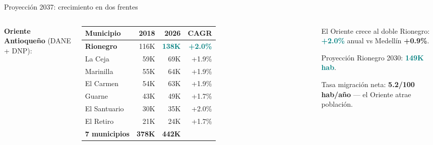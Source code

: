 \documentclass[aspectratio=169, 11pt]{beamer}
\newcommand{\highlight}[1]{\textcolor{teal}{\textbf{#1}}}
\newcommand{\src}[1]{\par\vspace{2pt}{\tiny\textcolor{slate}{Fuente: #1}}}
\begin{document}
\begin{frame}{Proyección 2037: crecimiento en dos frentes}
\begin{columns}[T]
{\small\textbf{Oriente Antioqueño} (DANE + DNP):}

\vspace{3pt}
{\scriptsize
\begin{tabular}{@{}lrrr@{}}
\toprule
\textbf{Municipio} & \textbf{2018} & \textbf{2026} & \textbf{CAGR} \\
\midrule
\rowcolor{teal!8}
\textbf{Rionegro} & 116K & \highlight{138K} & \highlight{+2.0\%} \\
La Ceja & 59K & 69K & +1.9\% \\
Marinilla & 55K & 64K & +1.9\% \\
El Carmen & 54K & 63K & +1.9\% \\
Guarne & 43K & 49K & +1.7\% \\
El Santuario & 30K & 35K & +2.0\% \\
El Retiro & 21K & 24K & +1.7\% \\
\midrule
\rowcolor{teal!6}
\textbf{7 municipios} & \textbf{378K} & \textbf{442K} & \\
\bottomrule
\end{tabular}
}

\vspace{4pt}
\begin{exampleblock}{\small El Oriente crece al doble}
\scriptsize
Rionegro: \highlight{+2.0\%} anual vs Medellín \textbf{+0.9\%}.

\vspace{2pt}
Proyección Rionegro 2030: \highlight{149K hab}.

\vspace{2pt}
Tasa migración neta: \textbf{5.2/100 hab/año} --- el Oriente atrae población.
\end{exampleblock}

\vspace{2pt}
\src{DANE CNPV 2018 (evm3-92yw), DNP Proyecciones}
\end{columns}
\end{frame}
\end{document}
